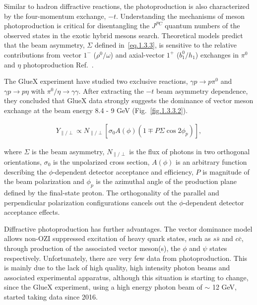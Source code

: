 Similar to hadron diffractive reactions, the photoproduction is also characterized by the four-momentum exchange, $-t$. Understanding the mechanisms of meson photoproduction is critical for disentangling the $J^{PC}$ quantum numbers of the observed states in the exotic hybrid mesons search. Theoretical models predict that the beam asymmetry, $\Sigma$ defined in~\ref{eq.1.3.3}, is sensitive to the relative contributions from vector $1^{-}$ ($\rho^{0}/\omega$) and axial-vector $1^{+}$ ($b_{1}^{0}/h_{1}$) exchanges in $\pi^{0}$ and $\eta$ photoproduction Ref.~\cite{11}.
~\par The GlueX experiment have studied two exclusive reactions, $\gamma p \rightarrow p \pi^{0}$ and $\gamma p \rightarrow p \eta$ with $\pi^{0}/\eta\rightarrow \gamma\gamma$. After extracting the $-t$ beam asymmetry dependence, they concluded that GlueX data strongly suggests the dominance of vector meson exchange at the beam energy 8.4 - 9 GeV (Fig.~\ref{fig.1.3.3.2}).

\begin{align}
    Y_{\parallel/\perp} \propto N_{\parallel/\perp}[\sigma_{0}A(\phi)(1 \mp P \Sigma \cos 2\phi_{p})],
    \label{eq.1.3.3}
\end{align}

\noindent where $\Sigma$ is the beam asymmetry, $N_{\parallel/\perp}$ is the flux of photons in two orthogonal orientations, $\sigma_{0}$ is the unpolarized cross section, $A(\phi)$ is an arbitrary function describing the $\phi$-dependent detector acceptance and efficiency, $P$ is magnitude of the beam polarization and $\phi_{p}$ is the azimuthal angle of the production plane defined by the final-state proton. The orthogonality of the parallel and perpendicular polarization configurations cancels out the $\phi$-dependent detector acceptance effects.
~\par Diffractive photoproduction has further advantages. The vector dominance model allows non-OZI suppressed excitation of heavy quark states, such as $s\bar{s}$ and $c\bar{c}$, through production of the associated vector meson(s), the $\phi$ and $\psi$ states respectively. Unfortunately, there are very few data from photoproduction. This is mainly due to the lack of high quality, high intensity photon beams and associated experimental apparatus, although this situation is starting to change, since the GlueX experiment, using a high energy photon beam of $\sim$ 12 GeV, started taking data since 2016.

